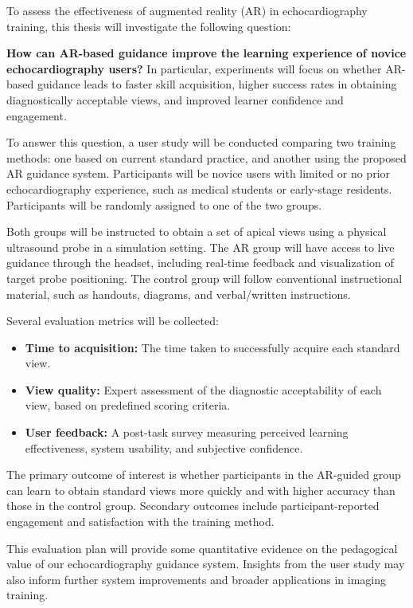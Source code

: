 \documentclass{article}
\begin{document}
To assess the effectiveness of augmented reality (AR) in echocardiography training, this thesis will investigate 
the following question:

\textbf{How can AR-based guidance improve the learning experience of novice echocardiography users?}
In particular, experiments will focus on whether AR-based guidance leads to faster skill acquisition, 
higher success rates in obtaining diagnostically acceptable views, and improved learner confidence and engagement.

To answer this question, a user study will be conducted comparing two training methods: one based on current standard practice, 
and another using the proposed AR guidance system. Participants will be novice users with limited or no prior echocardiography 
experience, such as medical students or early-stage residents. Participants will be randomly assigned to one of the two groups.

Both groups will be instructed to obtain a set of apical views using a physical ultrasound probe in a simulation setting. 
The AR group will have access to live guidance through the headset, including real-time feedback and visualization 
of target probe positioning. The control group will follow conventional instructional material, 
such as handouts, diagrams, and verbal/written instructions.

Several evaluation metrics will be collected:
\begin{itemize}
    \item \textbf{Time to acquisition:} The time taken to successfully acquire each standard view.
    \item \textbf{View quality:} Expert assessment of the diagnostic acceptability of each view, based on predefined scoring criteria.
    \item \textbf{User feedback:} A post-task survey measuring perceived learning effectiveness, system usability, and subjective confidence.
\end{itemize}

The primary outcome of interest is whether participants in the AR-guided group can learn to obtain standard views more quickly and with higher
accuracy than those in the control group. Secondary outcomes include participant-reported engagement and satisfaction with the training method.

This evaluation plan will provide some quantitative evidence on the pedagogical value of 
our echocardiography guidance system.
Insights from the user study may also inform further system improvements and broader applications in imaging training.
\end{document}

